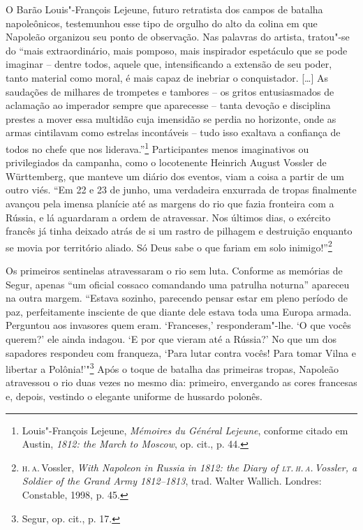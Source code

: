 O Barão Louis"-François Lejeune, futuro retratista dos campos de batalha
napoleônicos, testemunhou esse tipo de orgulho do alto da colina em que
Napoleão organizou seu ponto de observação. Nas palavras do artista,
tratou"-se do ``mais extraordinário, mais pomposo, mais inspirador
espetáculo que se pode imaginar -- dentre todos, aquele que,
intensificando a extensão de seu poder, tanto material como moral, é
mais capaz de inebriar o conquistador. [\ldots{}] As saudações de milhares
de trompetes e tambores -- os gritos entusiasmados de aclamação ao
imperador sempre que aparecesse -- tanta devoção e disciplina prestes a
mover essa multidão cuja imensidão se perdia no horizonte, onde as armas
cintilavam como estrelas incontáveis -- tudo isso exaltava a confiança de
todos no chefe que nos liderava.''\footnote{Louis"-François Lejeune, \textit{Mémoires du Général Lejeune}, conforme citado em Austin, \textit{1812: the March to Moscow}, op. cit., p. 44.} Participantes menos imaginativos ou privilegiados da campanha, como o locotenente
Heinrich August Vossler de Württemberg, que manteve um diário dos
eventos, viam a coisa a partir de um outro viés. ``Em 22 e 23 de junho,
uma verdadeira enxurrada de tropas finalmente avançou pela imensa
planície até as margens do rio que fazia fronteira com a Rússia, e lá
aguardaram a ordem de atravessar. Nos últimos dias, o exército francês
já tinha deixado atrás de si um rastro de pilhagem e destruição enquanto
se movia por território aliado. Só Deus sabe o que fariam em solo
inimigo!''\footnote{\textsc{h.\,a.}\,Vossler, \textit{With Napoleon in Russia in 1812: the Diary of \textsc{lt.\,h.\,a.}\,Vossler, a Soldier of the Grand Army 1812--1813}, trad. Walter Wallich. Londres: Constable, 1998, p. 45.}

Os primeiros sentinelas atravessaram o rio sem luta. Conforme as
memórias de Segur, apenas ``um oficial cossaco comandando uma patrulha
noturna'' apareceu na outra margem. ``Estava sozinho, parecendo pensar
estar em pleno período de paz, perfeitamente insciente de que diante
dele estava toda uma Europa armada. Perguntou aos invasores quem eram.
`Franceses,' responderam"-lhe. `O que vocês querem?' ele ainda indagou.
`E por que vieram até a Rússia?' No que um dos sapadores respondeu com
franqueza, `Para lutar contra vocês! Para tomar Vilna e libertar a
Polônia!'"\footnote{Segur, op. cit., p. 17.} Após o toque de batalha
das primeiras tropas, Napoleão atravessou o rio duas vezes no mesmo dia:
primeiro, envergando as cores francesas e, depois, vestindo o elegante
uniforme de hussardo polonês.

